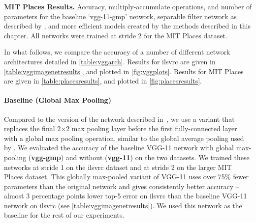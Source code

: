 \documentclass[thesis]{subfiles}
\begin{document}
\begin{table}[tbp]
    \centering
    \caption[Low-rank MIT Places results]{{\bf MIT Places Results.} Accuracy, multiply-accumulate operations, and number of parameters for the baseline `vgg-11-gmp' network, separable filter network as described by \citet{journals/corr/JaderbergVZ14}, and more efficient models created by the methods described in this chapter. All networks were trained at stride 2 for the MIT Places dataset.
    }
    \data
    \pgfplotstabletypeset[
        every head row/.style={
            before row=\toprule,after row=\midrule},
        every last row/.style={
            after row=\bottomrule},
        fixed zerofill,     %
        columns={Network, Stride, Multiply-Acc., Param., Top-1 Acc., Top-5 Acc.},
        column type/.add={lp{5em}p{5em}rrrr}{},
        columns/Multiply-Acc./.style={
            column name=FLOPS {\small $\times 10^{8}$},
            preproc/expr={{##1/1e8}}
        },
        columns/Param./.style={
            column name=Param. {\small $\times 10^{7}$},
            preproc/expr={{##1/1e7}}
        },
        columns/Network/.style={string type},
        columns/Stride/.style={precision=0},
        columns/Top-1 Acc./.style={precision=3},
        columns/Top-5 Acc./.style={precision=3},
        highlight col max ={\data}{Top-1 Acc.},
        highlight col max ={\data}{Top-5 Acc.}, 
        highlight col min ={\data}{Param.}, 
        highlight col min ={\data}{Multiply-Acc.}, 
        col sep=comma]{\data}
    \label{table:placesresults}
\end{table}
    
    
    In what follows, we compare the accuracy of a number of different network architectures detailed in  \cref{table:vggarch}. Results for \gls{ilsvrc} are given in \cref{table:vggimagenetresults}, and plotted in \cref{fig:vggplots}. Results for MIT Places are given in \cref{table:placesresults}, and plotted in \cref{fig:placesresults}. 
    
    \paragraph{Baseline (Global Max Pooling)}  Compared to the version of the network described in~\citep{Simonyan2014verydeep}, we use a variant that replaces the final $2$$\times$$2$ max pooling layer before the first fully-connected layer with a global max pooling operation, similar to the global average pooling used by \citet{Lin2013NiN,Szegedy2014going}. We evaluated the accuracy of the baseline VGG-11 network with global max-pooling (\textbf{vgg-gmp}) and without (\textbf{vgg-11}) on the two datasets. We trained these networks at stride 1 on the \gls{ilsvrc} dataset and at stride 2 on the larger MIT Places dataset. This globally max-pooled variant of VGG-11 uses over 75\% fewer parameters than the original network and gives consistently better accuracy -- almost 3 percentage points lower top-5 error on \gls{ilsvrc} than the baseline VGG-11 network on \gls{ilsvrc} (see \cref{table:vggimagenetresults}). We used this network as the baseline for the rest of our experiments.
    
\end{document}
